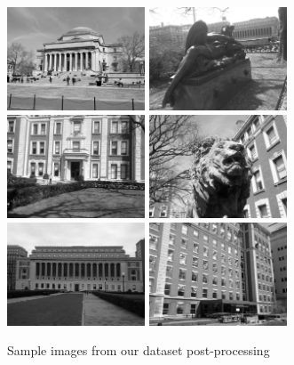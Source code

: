 \documentclass[twocolumn]{article}
\begin{document}
\begin{figure}
\includegraphics[width=41mm]{sample_data1.jpg}
\includegraphics[width=41mm]{sample_data2.jpg}\\
\includegraphics[width=41mm]{sample_data3.jpg}
\includegraphics[width=41mm]{sample_data4.jpg}\\
\includegraphics[width=41mm]{sample_data5.jpg}
\includegraphics[width=41mm]{sample_data6.jpg}
\caption{Sample images from our dataset post-processing}
\label{overflow}
\end{figure}
\end{document}
